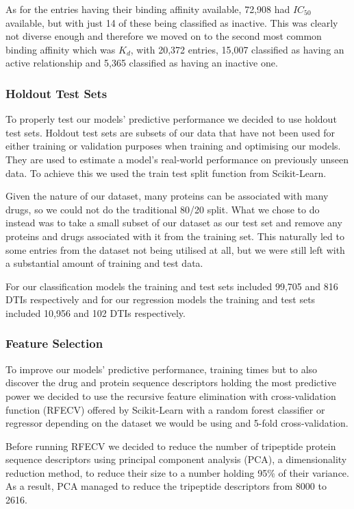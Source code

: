 As for the entries having their binding affinity available, 72,908 had $IC_{50}$ available, but with just 14 of these being classified as inactive. This was clearly not diverse enough and therefore we moved on to the second most common binding affinity which was $K_d$, with 20,372 entries, 15,007 classified as having an active relationship and 5,365 classified as having an inactive one.

\subsubsection{Holdout Test Sets}
\label{subsubsec:Holdout_Test_Sets}

To properly test our models' predictive performance we decided to use holdout test sets. Holdout test sets are subsets of our data that have not been used for either training or validation purposes when training and optimising our models. They are used to estimate a model's real-world performance on previously unseen data. To achieve this we used the train test split function from Scikit-Learn.

Given the nature of our dataset, many proteins can be associated with many drugs, so we could not do the traditional 80/20 split. What we chose to do instead was to take a small subset of our dataset as our test set and remove any proteins and drugs associated with it from the training set. This naturally led to some entries from the dataset not being utilised at all, but we were still left with a substantial amount of training and test data.

For our classification models the training and test sets included 99,705 and 816 DTIs respectively and for our regression models the training and test sets included 10,956 and 102 DTIs respectively.

\subsubsection{Feature Selection}
\label{subsubsec:Feature_Selection}

To improve our models' predictive performance, training times but to also discover the drug and protein sequence descriptors holding the most predictive power we decided to use the recursive feature elimination with cross-validation function (RFECV) offered by Scikit-Learn \citep{scikit-learn} with a random forest classifier or regressor depending on the dataset we would be using and 5-fold cross-validation.

Before running RFECV we decided to reduce the number of tripeptide protein sequence descriptors using principal component analysis (PCA), a dimensionality reduction method, to reduce their size to a number holding 95\% of their variance. As a result, PCA managed to reduce the tripeptide descriptors from 8000 to 2616.

